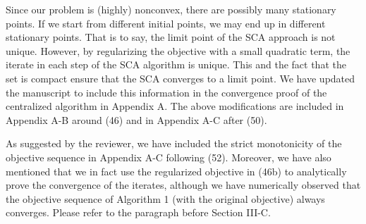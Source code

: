 \begin{enumerate}
Since our problem is (highly) nonconvex, there are possibly many stationary points. If we start from different initial points, we may end up in different stationary points. That is to say, the limit point of the \ac{SCA} approach is not unique. However, by regularizing the objective with a small quadratic term, the iterate in each step of the \ac{SCA} algorithm is unique. This and the fact that the set is compact ensure that the \ac{SCA} converges to a limit point. We have updated the manuscript to include this information in the convergence proof of the centralized algorithm in Appendix A. The above modifications are included in Appendix A-B around (46) and in Appendix A-C after (50).

  

\resp As suggested by the reviewer, we have included the strict monotonicity of the objective sequence in Appendix A-C following (52). Moreover, we have also mentioned that we in fact use the regularized objective in (46b) to analytically prove the convergence of the iterates, although we have numerically observed that the objective sequence of Algorithm 1 (with the original objective) always converges. Please refer to the paragraph before Section III-C.


\end{enumerate}
